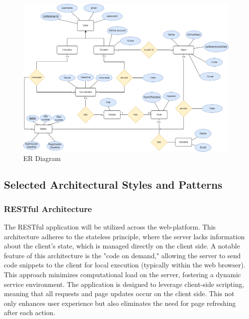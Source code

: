 \documentclass[12pt,oneside,a4paper]{article}
\begin{document}
\begin{figure}[htbp]
    \centering    \includegraphics[width=1\linewidth]{Images/Diagrams/ERDiagram.png}
    \caption{ER Diagram}
    
\end{figure}

\subsection{Selected Architectural Styles and Patterns}

\subsubsection{RESTful Architecture}
The RESTful application will be utilized across the web-platform. This architecture adheres to the stateless principle, where the server lacks information about the client's state, which is managed directly on the client side. A notable feature of this architecture is the "code on demand," allowing the server to send code snippets to the client for local execution (typically within the web browser). This approach minimizes computational load on the server, fostering a dynamic service environment. The application is designed to leverage client-side scripting, meaning that all requests and page updates occur on the client side. This not only enhances user experience but also eliminates the need for page refreshing after each action.

\clearpage
\end{document}
